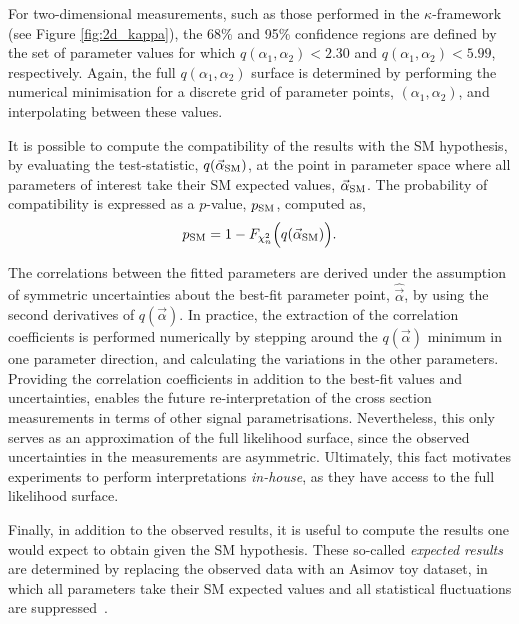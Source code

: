 For two-dimensional measurements, such as those performed in the $\kappa$-framework (see Figure \ref{fig:2d_kappa}), the 68\% and 95\% confidence regions are defined by the set of parameter values for which $q(\alpha_1,\alpha_2)<2.30$ and $q(\alpha_1,\alpha_2)<5.99$, respectively. Again, the full $q(\alpha_1,\alpha_2)$ surface is determined by performing the numerical minimisation for a discrete grid of parameter points, $(\alpha_1,\alpha_2)$, and interpolating between these values.

It is possible to compute the compatibility of the results with the SM hypothesis, by evaluating the test-statistic, $q(\vec{\alpha}_{\rm{SM}})$, at the point in parameter space where all parameters of interest take their SM expected values, $\vec{\alpha}_{\rm{SM}}$. The probability of compatibility is expressed as a $p$-value, $p_{\rm{SM}}$, computed as,
\begin{equation}
    p_{\rm{SM}} = 1-F_{\chi^2_n}\Big(q(\vec{\alpha}_{\rm{SM}})\Big).
\end{equation}

The correlations between the fitted parameters are derived under the assumption of symmetric uncertainties about the best-fit parameter point, $\hat{\vec{\alpha}}$, by using the second derivatives of $q(\vec{\alpha})$. In practice, the extraction of the correlation coefficients is performed numerically by stepping around the $q(\vec{\alpha})$ minimum in one parameter direction, and calculating the variations in the other parameters. Providing the correlation coefficients in addition to the best-fit values and uncertainties, enables the future re-interpretation of the cross section measurements in terms of other signal parametrisations. Nevertheless, this only serves as an approximation of the full likelihood surface, since the observed uncertainties in the measurements are asymmetric. Ultimately, this fact motivates experiments to perform interpretations \textit{in-house}, as they have access to the full likelihood surface.

Finally, in addition to the observed results, it is useful to compute the results one would expect to obtain given the SM hypothesis. These so-called \textit{expected results} are determined by replacing the observed data with an Asimov toy dataset, in which all parameters take their SM expected values and all statistical fluctuations are suppressed~\cite{Cowan:2010js}.


